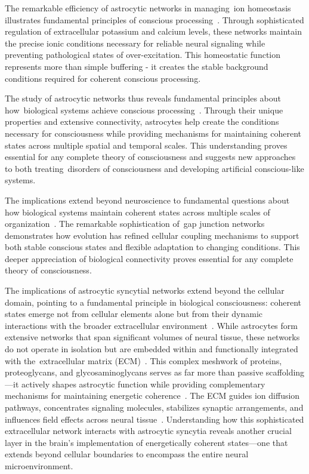 The remarkable efficiency of astrocytic networks in managing~ion homeostasis illustrates fundamental principles of conscious processing~\cite{Bellot-Saez2017, Wallraff2006}. Through sophisticated regulation of extracellular potassium and calcium levels, these networks maintain the precise ionic conditions necessary for reliable neural signaling while preventing pathological states of over-excitation. This homeostatic function represents more than simple buffering - it creates the stable background conditions required for coherent conscious processing.

The study of astrocytic networks thus reveals fundamental principles about how~biological systems achieve conscious processing~\cite{Giaume2010, Khakh2015}. Through their unique properties and extensive connectivity, astrocytes help create the conditions necessary for consciousness while providing mechanisms for maintaining coherent states across multiple spatial and temporal scales. This understanding proves essential for any complete theory of consciousness and suggests new approaches to both treating~disorders of consciousness and developing artificial conscious-like systems.

The implications extend beyond neuroscience to fundamental questions about how biological systems maintain coherent states across multiple scales of organization~\cite{Khakh2015, breakspear2005dynamics}. The remarkable sophistication of~gap junction networks demonstrates how evolution has refined cellular coupling mechanisms to support both stable conscious states and flexible adaptation to changing conditions. This deeper appreciation of biological connectivity proves essential for any complete theory of consciousness.

The implications of astrocytic syncytial networks extend beyond the cellular domain, pointing to a fundamental principle in biological consciousness: coherent states emerge not from cellular elements alone but from their dynamic interactions with the broader extracellular environment~\cite{Dityatev2010, Verkhratsky2018}. While astrocytes form extensive networks that span significant volumes of neural tissue, these networks do not operate in isolation but are embedded within and functionally integrated with the~extracellular matrix (ECM)~\cite{Song2018, Barker2018}. This complex meshwork of proteins, proteoglycans, and glycosaminoglycans serves as far more than passive scaffolding—it actively shapes astrocytic function while providing complementary mechanisms for maintaining energetic coherence~\cite{Dityatev2010, Frischknecht2012}. The ECM guides ion diffusion pathways, concentrates signaling molecules, stabilizes synaptic arrangements, and influences field effects across neural tissue~\cite{Vargova2014, Hrabetova2009}. Understanding how this sophisticated extracellular network interacts with astrocytic syncytia reveals another crucial layer in the brain's implementation of energetically coherent states—one that extends beyond cellular boundaries to encompass the entire neural microenvironment.
